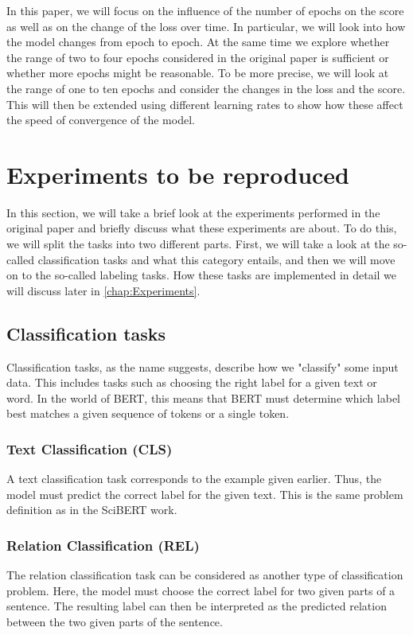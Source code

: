In this paper, we will focus on the influence of the number of epochs on the score as well as on the change of the loss over time. In particular, we will look into how the model changes from epoch to epoch. At the same time we explore whether the range of two to four epochs considered in the original paper is sufficient or whether more epochs might be reasonable. To be more precise, we will look at the range of one to ten epochs and consider the changes in the loss and the score. This will then be extended using different learning rates to show how these affect the speed of convergence of the model. 

\section{Experiments to be reproduced}
In this section, we will take a brief look at the experiments performed in the original paper and briefly discuss what these experiments are about. To do this, we will split the tasks into two different parts. First, we will take a look at the so-called classification tasks and what this category entails, and then we will move on to the so-called labeling tasks. How these tasks are implemented in detail we will discuss later in \autoref{chap:Experiments}.
\subsection{Classification tasks}
Classification tasks, as the name suggests, describe how we "classify" some input data. This includes tasks such as choosing the right label for a given text or word. In the world of BERT, this means that BERT must determine which label best matches a given sequence of tokens or a single token. 
\subsubsection{Text Classification (CLS)}
A text classification task corresponds to the example given earlier. Thus, the model must predict the correct label for the given text. This is the same problem definition as in the SciBERT work.
\subsubsection{Relation Classification (REL)}
The relation classification task can be considered as another type of classification problem. Here, the model must choose the correct label for two given parts of a sentence. The resulting label can then be interpreted as the predicted relation between the two given parts of the sentence.

